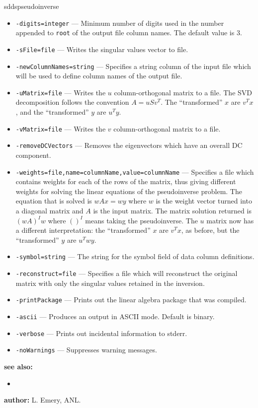 \begin{sddsprog}{sddspseudoinverse}
\begin{itemize}
      \item \verb|-digits=integer| --- Minimum number of digits used in the number appended to \verb|root| of the output file column names. The default value is 3.
      \item \verb|-sFile=file| --- Writes the singular values vector to file.
      \item \verb|-newColumnNames=string| --- Specifies a string column of the input file which will be used to define column names of the output file.
      \item \verb|-uMatrix=file| --- Writes the $u$ column-orthogonal matrix to a file. The SVD decomposition follows the convention $A = u S v^T$. The ``transformed'' $x$ are $v^T x$, and the ``transformed'' $y$ are $u^T y$.
      \item \verb|-vMatrix=file| --- Writes the $v$ column-orthogonal matrix to a file.
      \item \verb|-removeDCVectors| --- Removes the eigenvectors which have an overall DC component.
      \item \verb|-weights=file,name=columnName,value=columnName| --- Specifies a file which contains weights for each of the rows of the matrix, thus giving different weights for solving the linear equations of the pseudoinverse problem. The equation that is solved is $wAx = wy$ where $w$ is the weight vector turned into a diagonal matrix and $A$ is the input matrix. The matrix solution returned is $(wA)^I w$ where $()^I$ means taking the pseudoinverse. The $u$ matrix now has a different interpretation: the ``transformed'' $x$ are $v^T x$, as before, but the ``transformed'' $y$ are $u^T w y$.
      \item \verb|-symbol=string| --- The string for the symbol field of data column definitions.
      \item \verb|-reconstruct=file| --- Specifies a file which will reconstruct the original matrix with only the singular values retained in the inversion.
      \item \verb|-printPackage| --- Prints out the linear algebra package that was compiled.
      \item \verb|-ascii| --- Produces an output in ASCII mode. Default is binary.
      \item \verb|-verbose| --- Prints out incidental information to stderr.
      \item \verb|-noWarnings| --- Suppresses warning messages.
    \end{itemize}
  \item \textbf{see also:}
    \begin{itemize}
      \item {}
    \end{itemize}
  \item \textbf{author:} L. Emery, ANL.
\end{sddsprog}

